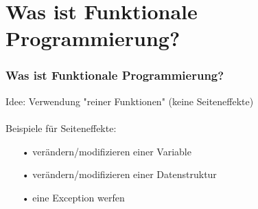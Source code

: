 	\section[Section]{Was ist Funktionale Programmierung?}
		\begin{frame}
			\frametitle{Was ist Funktionale Programmierung?}
				Idee:
				Verwendung "reiner Funktionen"  (keine Seiteneffekte) \\
				\leavevmode \\
				Beispiele für Seiteneffekte:
				\begin{itemize}
				\item[•] verändern/modifizieren einer Variable
				\item[•] verändern/modifizieren einer Datenstruktur
				\item[•] eine Exception werfen
				\end{itemize}
		\end{frame}